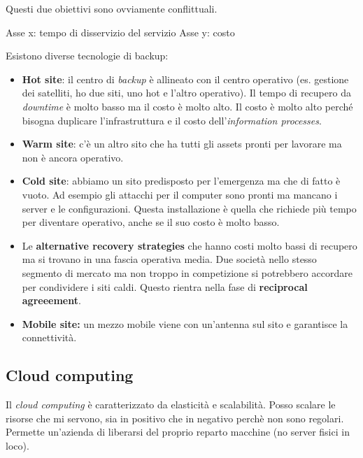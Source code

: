 Questi due obiettivi sono ovviamente conflittuali.


Asse x: tempo di disservizio del servizio
Asse y: costo

Esistono diverse tecnologie di backup:
\begin{itemize}
  \item \textbf{Hot site}: il centro di \textit{backup} è allineato con il 
  centro operativo (es. gestione dei satelliti, ho due siti, uno hot e l'altro 
  operativo). Il tempo di recupero da \textit{downtime} è molto basso ma il 
  costo è molto alto. Il costo è molto alto perché bisogna duplicare 
  l'infrastruttura e il costo dell'\textit{information processes}.
  
  \item \textbf{Warm site}: c'è un altro sito che ha tutti gli assets pronti 
  per lavorare ma non è ancora operativo.
  
  \item \textbf{Cold site}: abbiamo un sito predisposto per l'emergenza ma che 
  di fatto è vuoto. Ad esempio gli attacchi per il computer sono pronti ma 
  mancano i server e le configurazioni. Questa installazione è quella che 
  richiede più tempo per diventare operativo, anche se il suo costo è molto 
  basso.
  
  \item Le \textbf{alternative recovery strategies} che hanno costi molto bassi 
  di recupero ma si trovano in una fascia operativa media. Due società nello 
  stesso segmento di mercato ma non troppo in competizione si potrebbero 
  accordare per condividere i siti caldi. Questo rientra nella fase di 
  \textbf{reciprocal agreeement}.
  
  
  \item \textbf{Mobile site:} un mezzo mobile viene con un'antenna sul sito e 
  garantisce la connettività.
  
\end{itemize}


\subsection{Cloud computing}

Il \textit{cloud computing} è caratterizzato da elasticità e scalabilità. Posso 
scalare le risorse che mi servono, sia in positivo che in negativo perchè non 
sono regolari. Permette un'azienda di liberarsi del proprio reparto macchine 
(no server fisici in loco).

